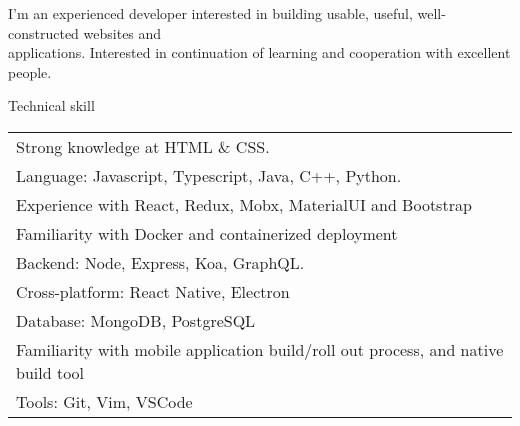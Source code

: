 \documentclass{resume}
\begin{document}
  I'm an experienced developer interested in building usable, useful, well-constructed websites and \\applications. 
  Interested in continuation of learning and cooperation with excellent people. 

  \begin{rSection}{Technical skill}
    \begin{tabular}{ @{} @{\hspace{6ex}} l }
      Strong knowledge at HTML \& CSS. \\
      Language: Javascript, Typescript, Java, C++, Python. \\
      Experience with React, Redux, Mobx, MaterialUI and Bootstrap \\
      Familiarity with Docker and containerized deployment \\
      Backend: Node, Express, Koa, GraphQL. \\
      Cross-platform: React Native, Electron \\
      Database: MongoDB, PostgreSQL \\
      Familiarity with mobile application build/roll out process, and native build tool \\
      Tools: Git, Vim, VSCode
    \end{tabular}
  \end{rSection}
  
\end{document}
